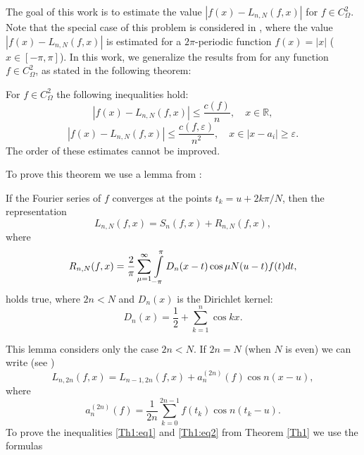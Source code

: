 The goal of this work is to estimate the value $\left|f(x)-L_{n,N}(f,x)\right|$ for $f\in C_{\Omega}^{2}$.
Note that the special case of this problem is considered in \cite{akniyev}, where the value $\left|f(x)-L_{n,N}(f,x)\right|$ is estimated for a $2\pi$-periodic function $f(x) = |x|$ ($x \in [-\pi,\pi]$).
In this work, we generalize the results from \cite{akniyev} for any function $f \in C_{\Omega}^{2}$, as stated in the following theorem:
\begin{theorem}
	\label{Th1} For $f\in C_{\Omega}^{2}$ the following inequalities hold:
	\begin{equation}\label{Th1:eq1}
	\left|f(x)-L_{n,N}(f,x)\right|\leq\frac{c(f)}{n},\quad x\in\mathbb{R},
	\end{equation}
	\begin{equation}\label{Th1:eq2}
	\left|f(x)-L_{n,N}(f,x)\right|\leq\frac{c(f,\varepsilon)}{n^{2}},\quad x\in\left|x-a_{i}\right|\geq\varepsilon.
	\end{equation}
	The order of these estimates cannot be improved.
\end{theorem}
To prove this theorem we use a lemma from \cite{shii-1983}:
\begin{lemma}
	If the Fourier series of $f$ converges at the points $t_{k}=u+2k\pi/N$,
	then the representation 
	\begin{equation}
	L_{n,N}(f,x)=S_{n}(f,x)+R_{n,N}(f,x),\label{eq:Lemma1_eq}
	\end{equation}
	where
	\begin{equation}
	R_{n,N}(f,x)=\frac{2}{\pi}\sum_{\mu=1}^{\infty}\intop_{-\pi}^{\pi}D_{n}(x-t)\cos\mu N(u-t)f(t)dt,\label{eq:RnN1}
	\end{equation}
	holds true, where $2n<N$ and $D_{n}(x)$ is the Dirichlet kernel:
	\begin{equation}\label{eq:D(x)}
	D_{n}(x)=\frac{1}{2}+\sum_{k=1}^{n}\cos kx.
	\end{equation}
\end{lemma}
This lemma considers only the case $2n < N$. If $2n=N$ (when $N$ is even) we can write (see \cite{shii-1983})
\begin{equation}
L_{n,2n}(f,x)=L_{n-1,2n}(f,x)+a_{n}^{(2n)}(f)\cos n(x-u),\label{eq:Ln2n_est}
\end{equation}
where
\begin{equation}
a_{n}^{(2n)}(f)=\frac{1}{2n}\sum_{k=0}^{2n-1}f(t_{k})\cos n(t_{k}-u).\label{eq:a_n_formula}
\end{equation}
To prove the inequalities \eqref{Th1:eq1} and \eqref{Th1:eq2} from Theorem \ref{Th1} we use the formulas 
